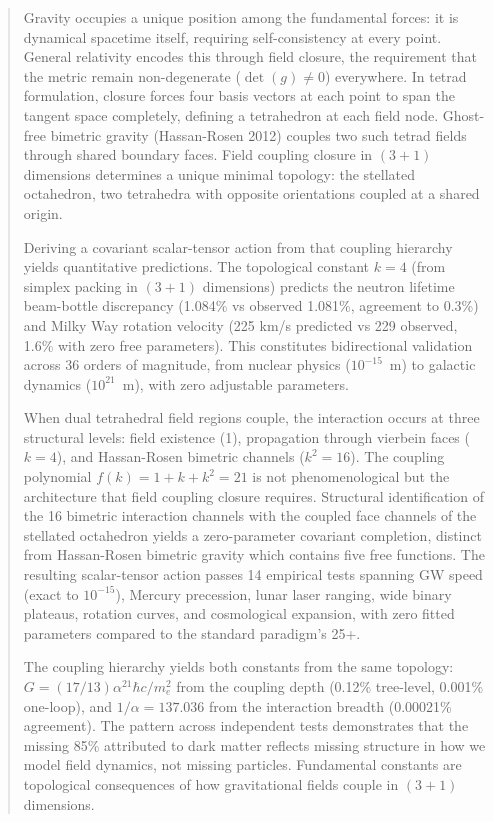 \documentclass[aps,prd,preprint,superscriptaddress,showpacs,preprintnumbers,amsmath,amssymb,nofootinbib]{revtex4-2}
\begin{document}
\begin{abstract}
Gravity occupies a unique position among the fundamental forces: it is dynamical spacetime itself, requiring self-consistency at every point. General relativity encodes this through field closure, the requirement that the metric remain non-degenerate ($\det(g) \neq 0$) everywhere. In tetrad formulation, closure forces four basis vectors at each point to span the tangent space completely, defining a tetrahedron at each field node. Ghost-free bimetric gravity (Hassan-Rosen 2012) couples two such tetrad fields through shared boundary faces. Field coupling closure in $(3{+}1)$ dimensions determines a unique minimal topology: the stellated octahedron, two tetrahedra with opposite orientations coupled at a shared origin.

Deriving a covariant scalar-tensor action from that coupling hierarchy yields quantitative predictions. The topological constant $k = 4$ (from simplex packing in $(3{+}1)$ dimensions) predicts the neutron lifetime beam-bottle discrepancy (1.084\% vs observed 1.081\%, agreement to 0.3\%) and Milky Way rotation velocity (225 km/s predicted vs 229 observed, 1.6\% with zero free parameters). This constitutes bidirectional validation across 36 orders of magnitude, from nuclear physics ($10^{-15}$~m) to galactic dynamics ($10^{21}$~m), with zero adjustable parameters.

When dual tetrahedral field regions couple, the interaction occurs at three structural levels: field existence (1), propagation through vierbein faces ($k = 4$), and Hassan-Rosen bimetric channels ($k^2 = 16$). The coupling polynomial $f(k) = 1 + k + k^2 = 21$ is not phenomenological but the architecture that field coupling closure requires. Structural identification of the 16 bimetric interaction channels with the coupled face channels of the stellated octahedron yields a zero-parameter covariant completion, distinct from Hassan-Rosen bimetric gravity which contains five free functions. The resulting scalar-tensor action passes 14 empirical tests spanning GW speed (exact to $10^{-15}$), Mercury precession, lunar laser ranging, wide binary plateaus, rotation curves, and cosmological expansion, with zero fitted parameters compared to the standard paradigm's 25+.

The coupling hierarchy yields both constants from the same topology: $G = (17/13)\alpha^{21} \hbar c/m_e^2$ from the coupling depth (0.12\% tree-level, 0.001\% one-loop), and $1/\alpha = 137.036$ from the interaction breadth (0.00021\% agreement). The pattern across independent tests demonstrates that the missing 85\% attributed to dark matter reflects missing structure in how we model field dynamics, not missing particles. Fundamental constants are topological consequences of how gravitational fields couple in $(3{+}1)$ dimensions.
\end{abstract}
\end{document}
